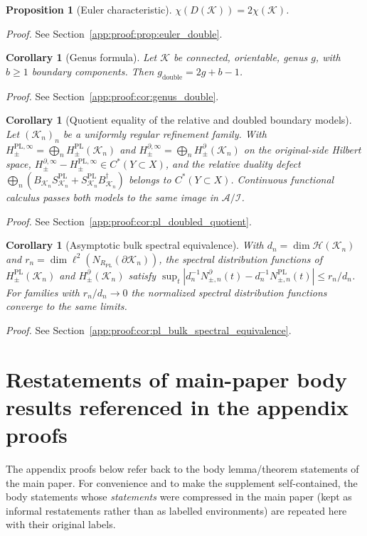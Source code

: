 \documentclass[11pt]{article}
\numberwithin{equation}{section}
\newtheorem{proposition}[theorem]{Proposition}
\newtheorem{corollary}[theorem]{Corollary}
\theoremstyle{definition}
\theoremstyle{remark}
\newcommand{\proofref}[1]{%
  \par\noindent\emph{Proof.} See Section~\ref{#1}.\par\medskip
}
\newcommand{\proofappendixref}[1]{\proofref{#1}}
\newcommand{\K}{\mathcal{K}}
\newcommand{\Hil}{\mathcal{H}}
\newcommand{\bd}{\partial}
\begin{document}
\begin{proposition}[Euler characteristic]\label{prop:euler_double}
\(\chi(D(\K))=2\chi(\K)\).
\end{proposition}
\proofappendixref{app:proof:prop:euler_double}

\begin{corollary}[Genus formula]\label{cor:genus_double}
Let $\K$ be connected, orientable, genus $g$, with $b\ge 1$ boundary components. Then
$g_{\mathrm{double}}=2g+b-1$.
\end{corollary}
\proofappendixref{app:proof:cor:genus_double}

\begin{corollary}[Quotient equality of the relative and doubled boundary models]\label{cor:pl_doubled_quotient}
Let $(\K_n)_n$ be a uniformly regular refinement family. With
$H^{\mathrm{PL},\infty}_\pm=\bigoplus_n H^{\mathrm{PL}}_\pm(\K_n)$ and
$H^{\bd,\infty}_\pm=\bigoplus_n H^{\bd}_\pm(\K_n)$ on the original-side Hilbert space,
$H^{\bd,\infty}_\pm-H^{\mathrm{PL},\infty}_\pm\in C^*(Y\subset X)$, and the relative duality defect
$\bigoplus_n(B_{\K_n}S^{\mathrm{PL}}_{\K_n}+S^{\mathrm{PL}}_{\K_n}B_{\K_n}^\dagger)$ belongs to
$C^*(Y\subset X)$. Continuous functional calculus passes both models to the same image in
$\mathcal A/\mathcal I$.
\end{corollary}
\proofappendixref{app:proof:cor:pl_doubled_quotient}

\begin{corollary}[Asymptotic bulk spectral equivalence]\label{cor:pl_bulk_spectral_equivalence}
With $d_n=\dim\Hil(\K_n)$ and $r_n=\dim\ell^2(N_{R_{\mathrm{PL}}}(\bd\K_n))$, the spectral
distribution functions of $H^{\mathrm{PL}}_\pm(\K_n)$ and $H^\partial_\pm(\K_n)$ satisfy
$\sup_t|d_n^{-1}N^{\bd}_{\pm,n}(t)-d_n^{-1}N^{\mathrm{PL}}_{\pm,n}(t)|\le r_n/d_n$.
For families with $r_n/d_n\to0$ the normalized spectral distribution functions converge to the
same limits.
\end{corollary}
\proofappendixref{app:proof:cor:pl_bulk_spectral_equivalence}

\section{Restatements of main-paper body results referenced in the appendix proofs}\label{sec:body_restatements}

The appendix proofs below refer back to the body lemma/theorem statements of the main paper.
For convenience and to make the supplement self-contained, the body statements whose
\emph{statements} were compressed in the main paper (kept as informal restatements rather than as
labelled environments) are repeated here with their original labels.
\end{document}
